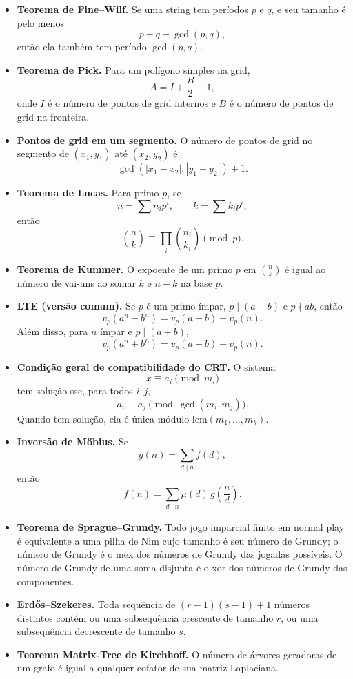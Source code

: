 \begin{itemize}[leftmargin=*,label={}]
  \item \textbf{Teorema de Fine--Wilf.}
  Se uma string tem per\'iodos $p$ e $q$, e seu tamanho \'e pelo menos
  \[
    p+q-\gcd(p,q),
  \]
  ent\~ao ela tamb\'em tem per\'iodo $\gcd(p,q)$.

  \item \textbf{Teorema de Pick.}
  Para um pol\'igono simples na grid,
  \[
    A = I + \frac{B}{2} - 1,
  \]
  onde $I$ \'e o n\'umero de pontos de grid internos e $B$ \'e o n\'umero de pontos de grid na fronteira.

  \item \textbf{Pontos de grid em um segmento.}
  O n\'umero de pontos de grid no segmento de $(x_1,y_1)$ at\'e $(x_2,y_2)$ \'e
  \[
    \gcd(|x_1-x_2|, |y_1-y_2|) + 1.
  \]

  \item \textbf{Teorema de Lucas.}
  Para primo $p$, se
  \[
    n = \sum n_i p^i,\qquad k = \sum k_i p^i,
  \]
  ent\~ao
  \[
    \binom{n}{k} \equiv \prod_i \binom{n_i}{k_i} \pmod p.
  \]

  \item \textbf{Teorema de Kummer.}
  O expoente de um primo $p$ em $\binom{n}{k}$ \'e igual ao n\'umero de vai-uns ao somar $k$ e $n-k$ na base $p$.

  \item \textbf{LTE (vers\~ao comum).}
  Se $p$ \'e um primo \'impar, $p \mid (a-b)$ e $p \nmid ab$, ent\~ao
  \[
    v_p(a^n-b^n)=v_p(a-b)+v_p(n).
  \]
  Al\'em disso, para $n$ \'impar e $p \mid (a+b)$,
  \[
    v_p(a^n+b^n)=v_p(a+b)+v_p(n).
  \]

  \ifextended
  \item \textbf{Condi\c{c}\~ao geral de compatibilidade do CRT.}
  O sistema
  \[
    x \equiv a_i \pmod{m_i}
  \]
  tem solu\c{c}\~ao sse, para todos $i,j$,
  \[
    a_i \equiv a_j \pmod{\gcd(m_i,m_j)}.
  \]
  Quando tem solu\c{c}\~ao, ela \'e \'unica m\'odulo $\mathrm{lcm}(m_1,\dots,m_k)$.
  \fi

  \item \textbf{Invers\~ao de M\"obius.}
  Se
  \[
    g(n)=\sum_{d \mid n} f(d),
  \]
  ent\~ao
  \[
    f(n)=\sum_{d \mid n} \mu(d)\, g\!\left(\frac{n}{d}\right).
  \]

  \ifextended
  \item \textbf{Teorema de Sprague--Grundy.}
  Todo jogo imparcial finito em normal play \'e equivalente a uma pilha de Nim cujo tamanho \'e seu n\'umero de Grundy; o n\'umero de Grundy \'e o mex dos n\'umeros de Grundy das jogadas poss\'iveis. O n\'umero de Grundy de uma soma disjunta \'e o xor dos n\'umeros de Grundy das componentes.
  \fi

  \item \textbf{Erd\H{o}s--Szekeres.}
  Toda sequ\^encia de $(r-1)(s-1)+1$ n\'umeros distintos cont\'em ou uma subsequ\^encia crescente de tamanho $r$, ou uma subsequ\^encia decrescente de tamanho $s$.

  \item \textbf{Teorema Matrix-Tree de Kirchhoff.}
  O n\'umero de \'arvores geradoras de um grafo \'e igual a qualquer cofator de sua matriz Laplaciana.
\end{itemize}

